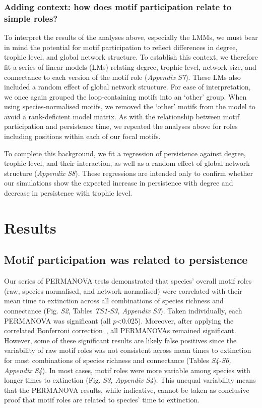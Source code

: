 \documentclass[12pt]{article}
\begin{document}
\begin{spacing}{2.0}
        \subsubsection*{Adding context: how does motif participation relate to simple roles?}

            To interpret the results of the analyses above, especially the LMMs, we must bear in mind the potential for motif participation to reflect differences in degree, trophic level, and global network structure. 
            To establish this context, we therefore fit a series of linear models (LMs) relating degree, trophic level, network size, and connectance to each version of the motif role (\emph{Appendix S7}). 
            These LMs also included a random effect of global network structure.
            For ease of interpretation, we once again grouped the loop-containing motifs into an `other' group. 
            When using species-normalised motifs, we removed the `other' motifs from the model to avoid a rank-deficient model matrix.
            As with the relationship between motif participation and persistence time, we repeated the analyses above for roles including positions within each of our focal motifs.
            
            
            To complete this background, we fit a regression of persistence against degree, trophic level, and their interaction, as well as a random effect of global network structure (\emph{Appendix S8}). 
            These regressions are intended only to confirm whether our simulations show the expected increase in persistence with degree and decrease in persistence with trophic level. 


\section*{Results}
	
    \subsection*{Motif participation was related to persistence}
    
		Our series of PERMANOVA tests demonstrated that species' overall motif roles (raw, species-normalised, and network-normalised) were correlated with their mean time to extinction across all combinations of species richness and connectance (Fig. \emph{S2}, Tables \emph{TS1-S3, Appendix S3}). 
        Taken individually, each PERMANOVA was significant (all $p$\textless0.025). Moreover, after applying the correlated Bonferroni correction~\citep{Drezner2016}, all PERMANOVAs remained significant.
		However, some of these significant results are likely false positives since the variability of raw motif roles was not consistent across mean times to extinction for most combinations of species richness and connectance (Tables \emph{S4-S6, Appendix S4}). 
        In most cases, motif roles were more variable among species with longer times to extinction (Fig. \emph{S3, Appendix S4}).
        This unequal variability means that the PERMANOVA results, while indicative, cannot be taken as conclusive proof that motif roles are related to species' time to extinction.
    


\end{spacing}
\end{document}

